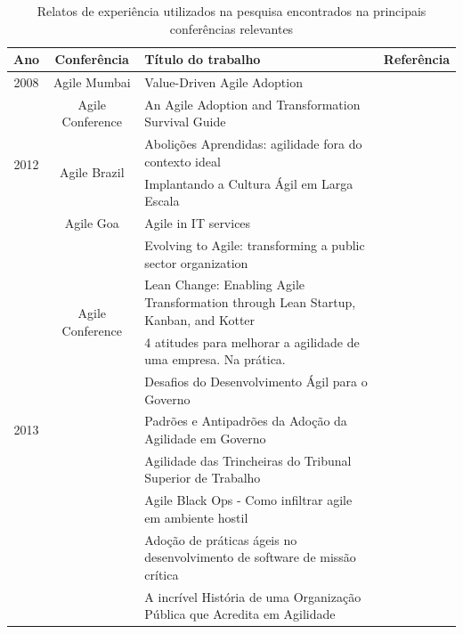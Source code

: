 \begin{table}[h]
	\centering
	\captionsetup{justification=centering,margin=1cm}
	\begin{tabular}{| c | c | m{8cm} | m{2.5cm} |} \hline \textbf{Ano} & \textbf{Conferência}  & \textbf{Título do trabalho} & \textbf{Referência} \\ \hline
		\multirow{1}{*}{2008}
			& Agile Mumbai & Value-Driven Agile Adoption & \cite{Ahmed2008} \\ \cline{2-4}
		\hline \hline
		\multirow{4}{*}{2012}
			& \multirow{1}{*}{Agile Conference}
				& An Agile Adoption and Transformation Survival Guide & \cite{Sahota2012} \\ \cline{2-4}
			& \multirow{2}{*}{Agile Brazil}
				& Abolições Aprendidas: agilidade fora do contexto ideal & \cite{Piegas2012} \\ \cline{3-4}
				&& Implantando a Cultura Ágil em Larga Escala & \cite{Parzinello2012} \\ \cline{2-4}
			& \multirow{1}{*}{Agile Goa}
				& Agile in IT services & \cite{Srinath2012} \\ \cline{2-4}
		\hline \hline
		\multirow{18}{*}{2013}
			& \multirow{4}{*}{Agile Conference}
				& Evolving to Agile: transforming a public sector organization & \cite{Karaj2013} \\ \cline{3-4}
				&& Lean Change: Enabling Agile Transformation through Lean Startup, Kanban, and Kotter & \cite{Hui2013} \\ \cline{2-4}
			& \multirow{12}{*}{Agile Brazil}
				& 4 atitudes para melhorar a agilidade de uma empresa. Na prática. & \cite{Valerio2013} \\ \cline{3-4}
				&& Desafios do Desenvolvimento Ágil para o Governo & \cite{Stefano2013} \\ \cline{3-4}
				&& Padrões e Antipadrões da Adoção da Agilidade em Governo & \cite{Rodrigues2013} \\ \cline{3-4}
				&& Agilidade das Trincheiras do Tribunal Superior de Trabalho & \cite{Vieira2013} \\ \cline{3-4}
				&& Agile Black Ops - Como infiltrar agile em ambiente hostil & \cite{Queiroz2013} \\ \cline{3-4}
				&& Adoção de práticas ágeis no desenvolvimento de software de missão crítica & \cite{Bastos2013} \\ \cline{3-4}
				&& A incrível História de uma Organização Pública que Acredita em Agilidade & \cite{Maciel2013} \\ \cline{2-4}
		\hline
	\end{tabular}
	\caption{Relatos de experiência utilizados na pesquisa encontrados na principais conferências relevantes}
	\label{tab:relatosEncontrados}
\end{table}

